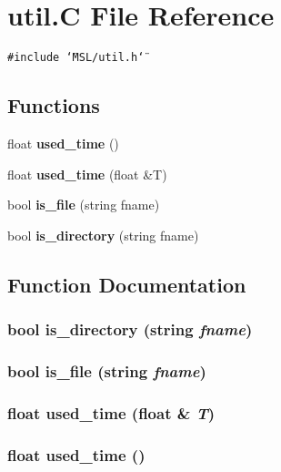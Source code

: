 \section{util.C File Reference}
\label{util_8C}
{\tt \#include \char`\"{}MSL/util.h\char`\"{}}\par
\subsection*{Functions}
\begin{CompactItemize}
\item 
float {\bf used\_\-time} ()
\item 
float {\bf used\_\-time} (float \&T)
\item 
bool {\bf is\_\-file} (string fname)
\item 
bool {\bf is\_\-directory} (string fname)
\end{CompactItemize}


\subsection{Function Documentation}
\subsubsection{\setlength{\rightskip}{0pt plus 5cm}bool is\_\-directory (string {\em fname})}\label{util_8C_a3}


\subsubsection{\setlength{\rightskip}{0pt plus 5cm}bool is\_\-file (string {\em fname})}\label{util_8C_a2}


\subsubsection{\setlength{\rightskip}{0pt plus 5cm}float used\_\-time (float \& {\em T})}\label{util_8C_a1}


\subsubsection{\setlength{\rightskip}{0pt plus 5cm}float used\_\-time ()}\label{util_8C_a0}


